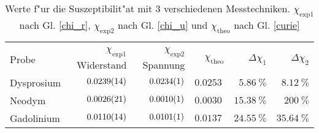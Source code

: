 
\begin{table}[!h]
\begin{center}
\begin{tabular}{|l|r|r|r|r|r|}
\hline
 &&&&&\\
 Probe & $\chi_\mathrm{exp1}$ Widerstand & $\chi_\mathrm{exp2}$ Spannung & $\chi_\mathrm{theo}$ & $\Delta \chi_\mathrm{1}$ & $\Delta \chi_\mathrm{2}$ \\
\hline
\hline

Dysprosium & $\SI{0.0239 (14)}{}$ & $\SI{0.0234 (1)}{}$ & $\SI{0.0253}{}$ & $\SI{5.86}{\%}$ & $\SI{8.12}{\%}$\\
Neodym     & $\SI{0.0026 (21)}{}$ & $\SI{0.0010 (1)}{}$ & $\SI{0.0030}{}$ & $\SI{15.38}{\%}$ & $\SI{200}{\%}$ \\
Gadolinium & $\SI{0.0110 (14)}{}$ & $\SI{0.0101 (1)}{}$ & $\SI{0.0137}{}$ & $\SI{24.55}{\%}$ & $\SI{35.64}{\%}$\\

\hline
\end{tabular}
\caption{Werte f"ur die Suszeptibilit"at mit 3 verschiedenen Messtechniken. $\chi_\mathrm{exp1}$ nach Gl. \eqref{chi_r}, $\chi_\mathrm{exp2}$ nach Gl. \eqref{chi_u} und $\chi_\mathrm{theo}$ nach Gl. \eqref{curie}}
\label{suszep}
\end{center}
\end{table}